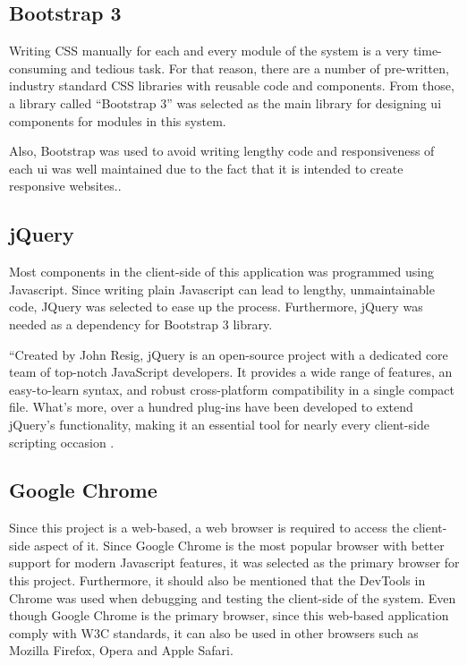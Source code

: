 \documentclass[12pt]{report}
\begin{document}
\subsection{Bootstrap 3}
Writing CSS manually for each and every module of the system is a very time-consuming and tedious task. For that reason, there are a number of pre-written, industry standard CSS libraries with reusable code and components. From those, a library called ``Bootstrap 3'' was selected as the main library for designing \acrshort{ui} components for modules in this system.

Also, Bootstrap was used to avoid writing lengthy code and responsiveness of each \acrshort{ui} was well maintained due to the fact that it is intended to create responsive websites.\cite{chahal_2019_bootstrap}.

\subsection{jQuery}
Most components in the client-side of this application was programmed using Javascript. Since writing plain Javascript can lead to lengthy, unmaintainable code, JQuery was selected to ease up the process. Furthermore, jQuery was needed as a dependency for Bootstrap 3 library.

``Created by John Resig, jQuery is an open-source project with a dedicated core team of top-notch JavaScript developers. It provides a wide range of features, an easy-to-learn syntax, and robust cross-platform compatibility in a single compact file. What's
more, over a hundred plug-ins have been developed to extend jQuery's functionality, making it an essential tool for nearly every client-side scripting occasion \cite{chaffer_2007_jquery}.

\subsection{Google Chrome}
Since this project is a web-based, a web browser is required to access the client-side aspect of it. Since Google Chrome is the most popular browser with better support for modern Javascript features, it was selected as the primary browser for this project. Furthermore, it should also be mentioned that the DevTools in Chrome was used when debugging and testing the client-side of the system. Even though Google Chrome is the primary browser, since this web-based application comply with W3C standards, it can also be used in other browsers such as Mozilla Firefox, Opera and Apple Safari.
\end{document}
